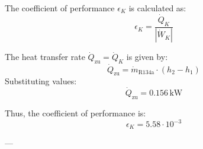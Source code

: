 The coefficient of performance \( \epsilon_K \) is calculated as:  
\[
\epsilon_K = \frac{\dot{Q}_K}{|\dot{W}_K|}
\]  

The heat transfer rate \( \dot{Q}_{\text{zu}} = \dot{Q}_K \) is given by:  
\[
\dot{Q}_{\text{zu}} = \dot{m}_{\text{R134a}} \cdot (h_2 - h_1)
\]  
Substituting values:  
\[
\dot{Q}_{\text{zu}} = 0.156 \, \text{kW}
\]  

Thus, the coefficient of performance is:  
\[
\epsilon_K = 5.58 \cdot 10^{-3}
\]  

---